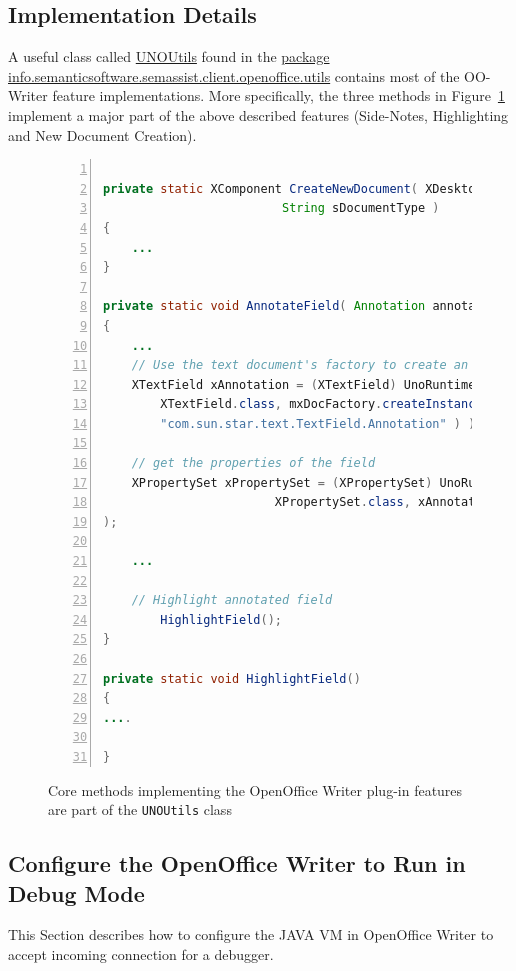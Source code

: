 \subsection{Implementation Details}
A useful class called \url{UNOUtils} found in the \url{package
  info.semanticsoftware.semassist.client.openoffice.utils} contains most of
the OO-Writer feature implementations.  More specifically, the three methods in
Figure~\ref{list:ssb} implement a major part of the above described features
(Side-Notes, Highlighting and New Document Creation).

\begin{figure}
\centering
\begin{lstlisting}[language=Java,numbers=left,xleftmargin=8mm,columns=flexible]

private static XComponent CreateNewDocument( XDesktop xDesktop, 
					     String sDocumentType )
{
	...
}

private static void AnnotateField( Annotation annotation )
{
	...
	// Use the text document's factory to create an Annotation text field
	XTextField xAnnotation = (XTextField) UnoRuntime.queryInterface(
		XTextField.class, mxDocFactory.createInstance(
		"com.sun.star.text.TextField.Annotation" ) );
	
	// get the properties of the field
	XPropertySet xPropertySet = (XPropertySet) UnoRuntime.queryInterface( 
						XPropertySet.class, xAnnotation
);
	
	...
	
	// Highlight annotated field
        HighlightField();
}

private static void HighlightField()
{
....

}
\end{lstlisting}
\caption{Core methods implementing the OpenOffice Writer plug-in features are
  part of the \texttt{UNOUtils} class}
\label{list:ssb}
\end{figure}

 
\subsection{Configure the OpenOffice Writer to Run in Debug Mode}
This Section describes how to configure the JAVA VM in OpenOffice Writer to accept incoming connection for a debugger.


